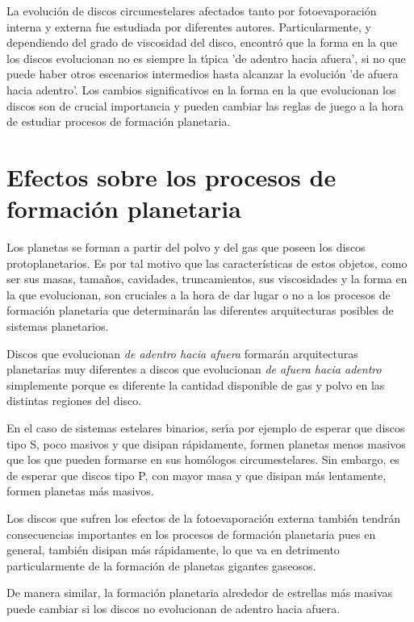 \documentclass[baaa]{baaa}
\begin{document}
La evoluci\'on de discos circumestelares afectados tanto por fotoevaporaci\'on interna y externa fue estudiada por diferentes autores. Particularmente, y dependiendo del grado de viscosidad del disco, \citet{Coleman2022} encontr\'o que la forma en la que los discos evolucionan no es siempre la t\'{\i}pica 'de adentro hacia afuera', si no que puede haber otros escenarios intermedios hasta alcanzar la evoluci\'on 'de afuera hacia adentro'. Los cambios significativos en la forma en la que evolucionan los discos son de crucial importancia y pueden cambiar las reglas de juego a la hora de estudiar procesos de formaci\'on planetaria.

\section{Efectos sobre los procesos de formaci\'on planetaria}

Los planetas se forman a partir del polvo y del gas que poseen los discos protoplanetarios. Es por tal motivo que las caracter\'{i}sticas de estos objetos, como ser sus masas, tama\~nos, cavidades, truncamientos, sus viscosidades y la forma en la que evolucionan, son cruciales a la hora de dar lugar o no a los procesos de formaci\'on planetaria que determinar\'an las diferentes arquitecturas posibles de sistemas planetarios. 

Discos que evolucionan \textit{de adentro hacia afuera} formar\'an arquitecturas planetarias muy diferentes a discos que evolucionan \textit{de afuera hacia adentro} simplemente porque es diferente la cantidad disponible de gas y polvo en las distintas regiones del disco. 

En el caso de sistemas estelares binarios, ser\'{\i}a por ejemplo de esperar que discos tipo S, poco masivos y que disipan r\'apidamente,  formen planetas menos masivos que los que pueden formarse en sus hom\'ologos circumestelares. Sin embargo, es de esperar que discos tipo P, con mayor masa y que disipan m\'as lentamente, formen planetas m\'as masivos. 

Los discos que sufren los efectos de la fotoevaporaci\'on externa tambi\'en tendr\'an consecuencias importantes en los procesos de formaci\'on planetaria pues en general, tambi\'en disipan m\'as r\'apidamente, lo que va en detrimento particularmente de la formaci\'on de planetas gigantes gaseosos. 

De manera similar, la formaci\'on planetaria alrededor de estrellas m\'as masivas puede cambiar si los discos no evolucionan de adentro hacia afuera. 
\end{document}
